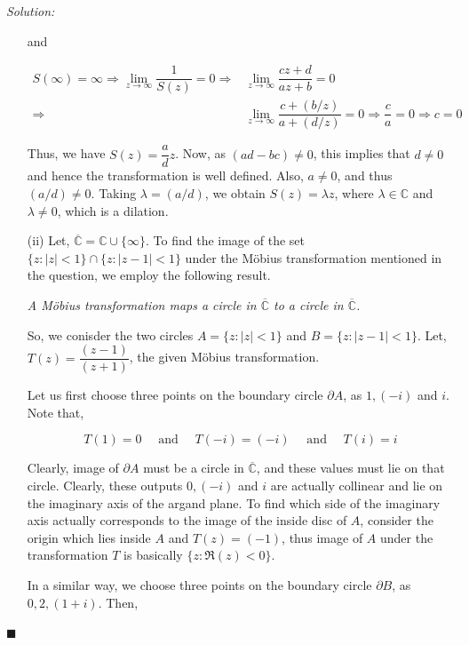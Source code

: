 \documentclass[12pt]{article}
\newcommand{\C}{\mathbb{C}}
\newcommand{\Cinf}{\overline{\mathbb{C}}}
\theoremstyle{definition}
\newenvironment{answer}{\textit{Solution: }\quad }{ \hfill $\blacksquare$}
\numberwithin{equation}{section}
\begin{document}
\begin{answer}
\begin{enumerate}
		and 

		\begin{align*}
			S(\infty) = \infty \Rightarrow \lim_{z \rightarrow \infty} \dfrac{1}{S(z)} = 0
			\Rightarrow & \lim_{z \rightarrow \infty} \dfrac{cz+d}{az + b} = 0 \\
			\Rightarrow & \lim_{z \rightarrow \infty} \dfrac{c+(b/z)}{a + (d/z)} = 0 \Rightarrow \dfrac{c}{a} = 0
			\Rightarrow c = 0			
		\end{align*}

		Thus, we have $S(z) = \dfrac{a}{d}z$. Now, as $(ad - bc)\neq 0$, this implies that $d \neq 0$ and hence the transformation is well defined. Also, $a \neq 0$, and thus $(a/d) \neq 0$. Taking $\lambda = (a/d)$, we obtain $S(z) = \lambda z$, where $\lambda \in \C$ and $\lambda \neq 0$, which is a dilation. 

		\item[(ii)] Let, $\Cinf = \C \cup \{ \infty \}$. To find the image of the set $\{ z : \vert z \vert < 1 \} \cap \{ z : \vert z - 1\vert < 1 \}$ under the M\"{o}bius transformation mentioned in the question, 
		we employ the following result.

		\begin{center}
			\textit{A M\"{o}bius transformation maps a circle in $\Cinf$ to a circle in $\Cinf$.}
		\end{center}

		So, we conisder the two circles $A = \{ z : \vert z \vert < 1\}$ and $B = \{ z : \vert z - 1 \vert < 1 \}$. Let, $T(z) = \dfrac{(z - 1)}{(z + 1)}$, the given M\"{o}bius transformation.
		
		Let us first choose three points on the boundary circle $\partial A$, as $1, (-i)$ and $i$. Note that, 

		$$
		T(1) = 0 \quad \text{ and } \quad
		T(-i) = (-i) \quad \text{ and } \quad
		T(i) = i
		$$

		Clearly, image of $\partial A$ must be a circle in $\Cinf$, and these values must lie on that circle. Clearly, these outputs $0, (-i)$ and $i$ are actually collinear and lie on the imaginary axis of the argand plane. To find which side of the imaginary axis actually corresponds to the image of the inside disc of $A$, consider the origin which lies inside $A$ and $T(z) = (-1)$, thus image of $A$ under the transformation $T$ is basically $\{ z : \Re(z) < 0 \}$.

		In a similar way, we choose three points on the boundary circle $\partial B$, as $0, 2, (1+i)$. Then,


\end{enumerate}
\end{answer}
\end{document}
